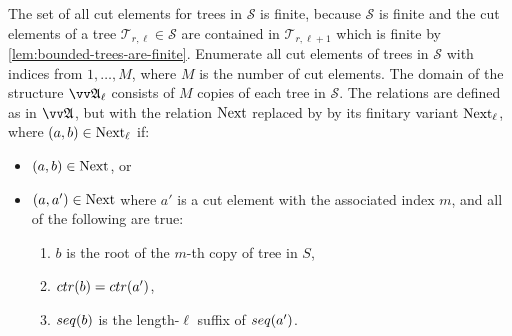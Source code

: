 The set of all cut elements for trees in $\mathcal{S}$ is finite, because $\mathcal{S}$ is finite and the cut elements of a tree $\mathcal{T}_{r,\ell} \in \mathcal{S}$ are contained in $\mathcal{T}_{r,\ell+1}$ which is finite by \cref{lem:bounded-trees-are-finite}.
Enumerate all cut elements of trees in $\mathcal{S}$ with indices from $1, \ldots, M$, where $M$ is the number of cut elements.
The domain of the structure $\unravel{A}_{\ell}$ consists of $M$ copies of each tree in $\mathcal{S}$.
The relations are defined as in $\unravel{A}$, but with the relation $\mathrm{Next}$ replaced by by its finitary variant $\mathrm{Next}_{\ell}$, where $(a,b) \in \mathrm{Next}_{\ell}$ if:
\begin{itemize}
  \item $(a,b) \in \mathrm{Next}$, or
  \item $(a,a') \in \mathrm{Next}$ where $a'$ is a cut element with the associated index $m$, and all of the following are true:
        \begin{enumerate}
          \item $b$ is the root of the $m$-th copy of tree in $S$,
          \item $\ctr{b} = \ctr{a'}$,
          \item $\seq{b}$ is the length-$\ell$ suffix of $\seq{a'}$.
        \end{enumerate}
\end{itemize}

